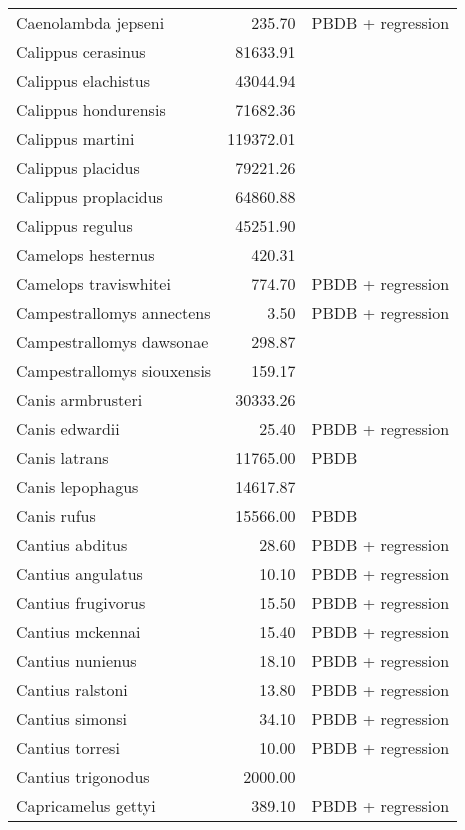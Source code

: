 \begin{table}[ht]
\begin{tabular}{lrl}
  Caenolambda jepseni & 235.70 & PBDB + regression \\ 
  Calippus cerasinus & 81633.91 & \cite{Tomiya2013} \\ 
  Calippus elachistus & 43044.94 & \cite{Tomiya2013} \\ 
  Calippus hondurensis & 71682.36 & \cite{Tomiya2013} \\ 
  Calippus martini & 119372.01 & \cite{Tomiya2013} \\ 
  Calippus placidus & 79221.26 & \cite{Tomiya2013} \\ 
  Calippus proplacidus & 64860.88 & \cite{Tomiya2013} \\ 
  Calippus regulus & 45251.90 & \cite{Tomiya2013} \\ 
  Camelops hesternus & 420.31 & \cite{Smith2004} \\ 
  Camelops traviswhitei & 774.70 & PBDB + regression \\ 
  Campestrallomys annectens & 3.50 & PBDB + regression \\ 
  Campestrallomys dawsonae & 298.87 & \cite{Tomiya2013} \\ 
  Campestrallomys siouxensis & 159.17 & \cite{Tomiya2013} \\ 
  Canis armbrusteri & 30333.26 & \cite{Tomiya2013} \\ 
  Canis edwardii & 25.40 & PBDB + regression \\ 
  Canis latrans & 11765.00 & PBDB \\ 
  Canis lepophagus & 14617.87 & \cite{Tomiya2013} \\ 
  Canis rufus & 15566.00 & PBDB \\ 
  Cantius abditus & 28.60 & PBDB + regression \\ 
  Cantius angulatus & 10.10 & PBDB + regression \\ 
  Cantius frugivorus & 15.50 & PBDB + regression \\ 
  Cantius mckennai & 15.40 & PBDB + regression \\ 
  Cantius nunienus & 18.10 & PBDB + regression \\ 
  Cantius ralstoni & 13.80 & PBDB + regression \\ 
  Cantius simonsi & 34.10 & PBDB + regression \\ 
  Cantius torresi & 10.00 & PBDB + regression \\ 
  Cantius trigonodus & 2000.00 & \cite{Soligo2006} \\ 
  Capricamelus gettyi & 389.10 & PBDB + regression \\ 

\end{tabular}
\end{table}
